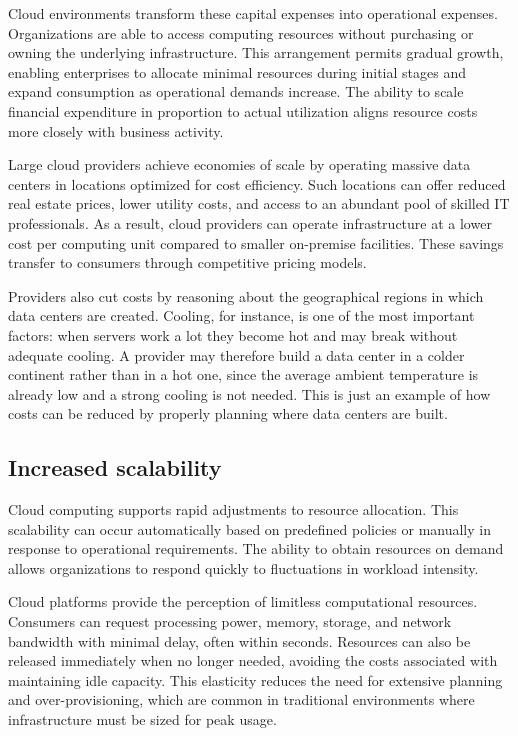 \documentclass[11pt,a4paper,openany]{report}
\begin{document}
Cloud environments transform these capital expenses into operational expenses. Organizations are able to access computing resources without purchasing or owning the underlying infrastructure. This arrangement permits gradual growth, enabling enterprises to allocate minimal resources during initial stages and expand consumption as operational demands increase. The ability to scale financial expenditure in proportion to actual utilization aligns resource costs more closely with business activity.

Large cloud providers achieve economies of scale by operating massive data centers in locations optimized for cost efficiency. Such locations can offer reduced real estate prices, lower utility costs, and access to an abundant pool of skilled IT professionals. As a result, cloud providers can operate infrastructure at a lower cost per computing unit compared to smaller on-premise facilities. These savings transfer to consumers through competitive pricing models.

Providers also cut costs by reasoning about the geographical regions in which data centers are created. Cooling, for instance, is one of the most important factors: when servers work a lot they become hot and may break without adequate cooling. A provider may therefore build a data center in a colder continent rather than in a hot one, since the average ambient temperature is already low and a strong cooling is not needed. This is just an example of how costs can be reduced by properly planning where data centers are built.

\subsection{Increased scalability}

Cloud computing supports rapid adjustments to resource allocation. This scalability can occur automatically based on predefined policies or manually in response to operational requirements. The ability to obtain resources on demand allows organizations to respond quickly to fluctuations in workload intensity.

Cloud platforms provide the perception of limitless computational resources. Consumers can request processing power, memory, storage, and network bandwidth with minimal delay, often within seconds. Resources can also be released immediately when no longer needed, avoiding the costs associated with maintaining idle capacity. This elasticity reduces the need for extensive planning and over-provisioning, which are common in traditional environments where infrastructure must be sized for peak usage.
\end{document}
